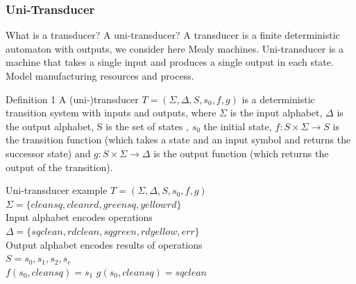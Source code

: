 \documentclass{beamer}
\theoremstyle{definition}
\theoremstyle{plain}
\begin{document}
 \begin{frame}
\frametitle{Uni-Transducer}
\begin{block}{What is a transducer? A uni-transducer?}
A transducer is a finite deterministic automaton with outputs, we consider here Mealy machines.
Uni-transducer is a machine that takes a single input and produces a single output in each state.
Model manufacturing resources and process.
\end{block}
\begin{alertblock}{Definition 1}
A (uni-)transducer $ T = ( \Sigma, \Delta, S, s_{0}, f, g) $ is a deterministic transition system with inputs and outputs, where $\Sigma$ is the input alphabet, $\Delta$ is the output alphabet, S is the set of states , $ s_{0} $ the initial state, $ f: S \times \Sigma \rightarrow S $ is the transition function (which takes a state and an input symbol and returns the successor state) and $ g: S \times \Sigma \rightarrow \Delta $ is the output function (which returns the output of the transition).
\end{alertblock}
\end{frame}
\begin{frame}{Uni-transducer example}
$ T = ( \Sigma, \Delta, S, s_{0}, f, g) $ \\
$\Sigma = \{cleansq, cleanrd, greensq, yellowrd\}$ \\
Input alphabet encodes operations \\
$\Delta = \{sqclean, rdclean, sqgreen, rdyellow, err \}$ \\
Output alphabet encodes results of operations \\
$S = {s_{0}, s_{1}, s_{2}, s_{e}}$ \\
$f(s_{0}, cleansq)=s_{1}$ 
$g(s_{0}, cleansq)=sqclean$
    
\end{frame}
\end{document}
